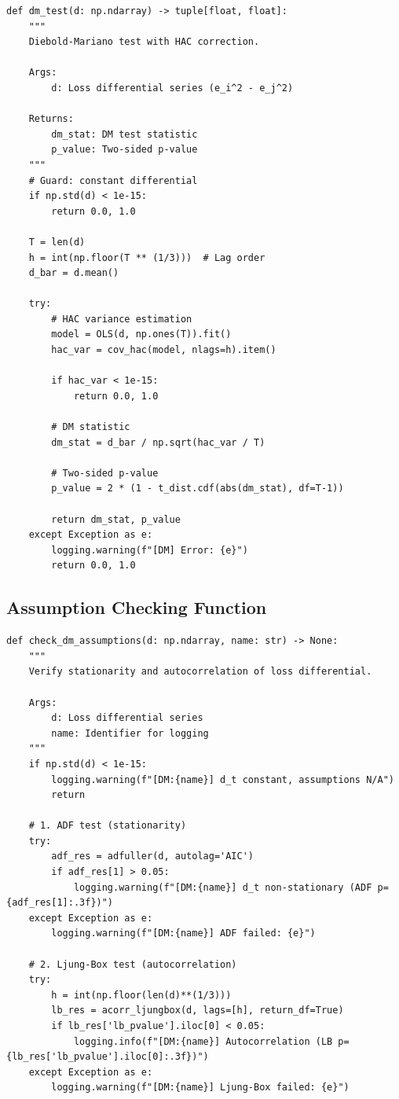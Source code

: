 \documentclass[11pt,a4paper]{article}
\begin{document}
\begin{lstlisting}[caption={Complete DM Test Implementation}, label=lst:dm_test]
def dm_test(d: np.ndarray) -> tuple[float, float]:
    """
    Diebold-Mariano test with HAC correction.
    
    Args:
        d: Loss differential series (e_i^2 - e_j^2)
    
    Returns:
        dm_stat: DM test statistic
        p_value: Two-sided p-value
    """
    # Guard: constant differential
    if np.std(d) < 1e-15:
        return 0.0, 1.0
    
    T = len(d)
    h = int(np.floor(T ** (1/3)))  # Lag order
    d_bar = d.mean()
    
    try:
        # HAC variance estimation
        model = OLS(d, np.ones(T)).fit()
        hac_var = cov_hac(model, nlags=h).item()
        
        if hac_var < 1e-15:
            return 0.0, 1.0
        
        # DM statistic
        dm_stat = d_bar / np.sqrt(hac_var / T)
        
        # Two-sided p-value
        p_value = 2 * (1 - t_dist.cdf(abs(dm_stat), df=T-1))
        
        return dm_stat, p_value
    except Exception as e:
        logging.warning(f"[DM] Error: {e}")
        return 0.0, 1.0
\end{lstlisting}

\subsection{Assumption Checking Function}

\begin{lstlisting}[caption={Assumption Verification}]
def check_dm_assumptions(d: np.ndarray, name: str) -> None:
    """
    Verify stationarity and autocorrelation of loss differential.
    
    Args:
        d: Loss differential series
        name: Identifier for logging
    """
    if np.std(d) < 1e-15:
        logging.warning(f"[DM:{name}] d_t constant, assumptions N/A")
        return
    
    # 1. ADF test (stationarity)
    try:
        adf_res = adfuller(d, autolag='AIC')
        if adf_res[1] > 0.05:
            logging.warning(f"[DM:{name}] d_t non-stationary (ADF p={adf_res[1]:.3f})")
    except Exception as e:
        logging.warning(f"[DM:{name}] ADF failed: {e}")
    
    # 2. Ljung-Box test (autocorrelation)
    try:
        h = int(np.floor(len(d)**(1/3)))
        lb_res = acorr_ljungbox(d, lags=[h], return_df=True)
        if lb_res['lb_pvalue'].iloc[0] < 0.05:
            logging.info(f"[DM:{name}] Autocorrelation (LB p={lb_res['lb_pvalue'].iloc[0]:.3f})")
    except Exception as e:
        logging.warning(f"[DM:{name}] Ljung-Box failed: {e}")
\end{lstlisting}
\end{document}
